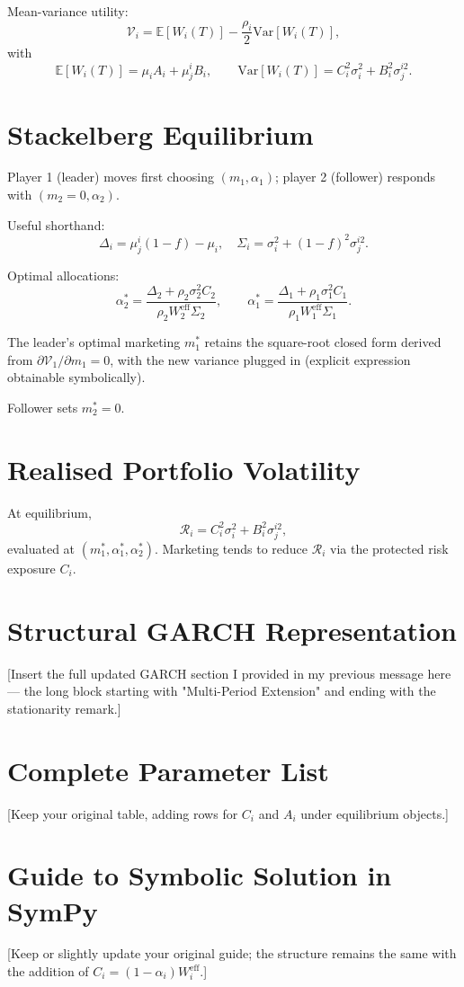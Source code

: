 \documentclass[12pt,a4paper]{article}
\newcommand{\E}{\mathbb{E}}
\newcommand{\Var}{\mathrm{Var}}
\newcommand{\1}{\mathbf{1}}
\begin{document}
Mean-variance utility:
\[
\mathcal{V}_i = \E[W_i(T)] - \frac{\rho_i}{2} \Var[W_i(T)],
\]
with
\[
\E[W_i(T)] = \mu_i A_i + \mu_j^i B_i, \qquad \Var[W_i(T)] = C_i^2 \sigma_i^2 + B_i^2 \sigma_j^{i2}.
\]

\section{Stackelberg Equilibrium}

Player 1 (leader) moves first choosing \((m_1, \alpha_1)\); player 2 (follower) responds with \((m_2=0, \alpha_2)\).

Useful shorthand:
\[
\Delta_i = \mu_j^i(1-f) - \mu_i, \quad \Sigma_i = \sigma_i^2 + (1-f)^2 \sigma_j^{i2}.
\]

Optimal allocations:
\[
\boxed{\alpha_2^* = \frac{\Delta_2 + \rho_2 \sigma_2^2 C_2}{\rho_2 W_2^{\mathrm{eff}} \Sigma_2}}, \qquad
\boxed{\alpha_1^* = \frac{\Delta_1 + \rho_1 \sigma_1^2 C_1}{\rho_1 W_1^{\mathrm{eff}} \Sigma_1}}.
\]

The leader's optimal marketing \(m_1^*\) retains the square-root closed form derived from \(\partial \mathcal{V}_1 / \partial m_1 = 0\), with the new variance plugged in (explicit expression obtainable symbolically).

Follower sets \(m_2^* = 0\).

\section{Realised Portfolio Volatility}

At equilibrium,
\[
\mathcal{R}_i = C_i^2 \sigma_i^2 + B_i^2 \sigma_j^{i2},
\]
evaluated at \((m_1^*, \alpha_1^*, \alpha_2^*)\). Marketing tends to reduce \(\mathcal{R}_i\) via the protected risk exposure \(C_i\).

\section{Structural GARCH Representation}

[Insert the full updated GARCH section I provided in my previous message here — the long block starting with "Multi-Period Extension" and ending with the stationarity remark.]

\section{Complete Parameter List}

[Keep your original table, adding rows for \(C_i\) and \(A_i\) under equilibrium objects.]

\section{Guide to Symbolic Solution in SymPy}

[Keep or slightly update your original guide; the structure remains the same with the addition of \(C_i = (1-\alpha_i)W_i^{\mathrm{eff}}\).]
\end{document}
